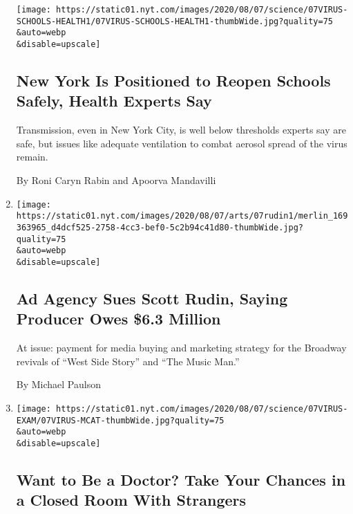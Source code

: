 \begin{enumerate}
  \texttt{[image: https://static01.nyt.com/images/2020/08/07/science/07VIRUS-SCHOOLS-HEALTH1/07VIRUS-SCHOOLS-HEALTH1-thumbWide.jpg?quality=75\\\&auto=webp\\\&disable=upscale]}

  \hypertarget{new-york-is-positioned-to-reopen-schools-safely-health-experts-say}{%
  \subsection{New York Is Positioned to Reopen Schools Safely, Health
  Experts
  Say}\label{new-york-is-positioned-to-reopen-schools-safely-health-experts-say}}

  Transmission, even in New York City, is well below thresholds experts
  say are safe, but issues like adequate ventilation to combat aerosol
  spread of the virus remain.

  By Roni Caryn Rabin and Apoorva Mandavilli
\item
  \href{/2020/08/07/theater/scott-rudin-spotco-broadway-lawsuit.html}{}

  \texttt{[image: https://static01.nyt.com/images/2020/08/07/arts/07rudin1/merlin\_169363965\_d4dcf525-2758-4cc3-bef0-5c2b94c41d80-thumbWide.jpg?quality=75\\\&auto=webp\\\&disable=upscale]}

  \hypertarget{ad-agency-sues-scott-rudin-saying-producer-owes-63-million}{%
  \subsection{Ad Agency Sues Scott Rudin, Saying Producer Owes \$6.3
  Million}\label{ad-agency-sues-scott-rudin-saying-producer-owes-63-million}}

  At issue: payment for media buying and marketing strategy for the
  Broadway revivals of ``West Side Story'' and ``The Music Man.''

  By Michael Paulson
\item
  \href{/2020/08/07/health/coronavirus-exams-mcat.html}{}

  \texttt{[image: https://static01.nyt.com/images/2020/08/07/science/07VIRUS-EXAM/07VIRUS-MCAT-thumbWide.jpg?quality=75\\\&auto=webp\\\&disable=upscale]}

  \hypertarget{want-to-be-a-doctor-take-your-chances-in-a-closed-room-with-strangers}{%
  \subsection{Want to Be a Doctor? Take Your Chances in a Closed Room
  With
  Strangers}\label{want-to-be-a-doctor-take-your-chances-in-a-closed-room-with-strangers}}


\end{enumerate}
